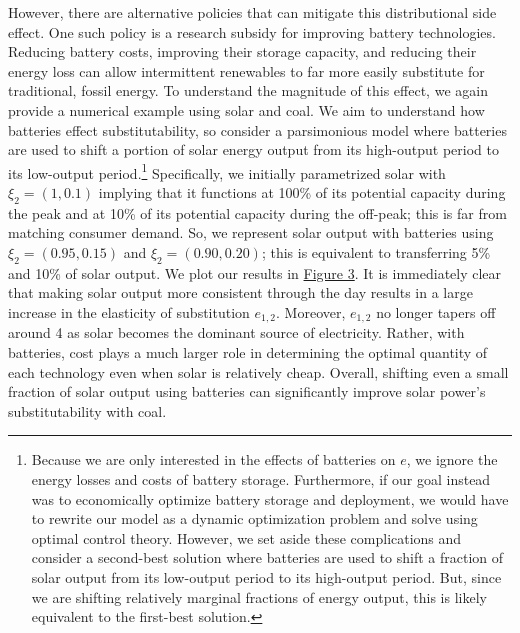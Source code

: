 \documentclass[11pt,a4paper]{extarticle}
\begin{document}
However, there are alternative policies that can mitigate this distributional side effect. One such policy is a research subsidy for improving battery technologies. Reducing battery costs, improving their storage capacity, and reducing their  energy loss can allow intermittent renewables to far more easily substitute for traditional, fossil energy. To understand the magnitude of this effect, we again provide a numerical example using solar and coal. We aim to understand how batteries effect substitutability, so consider a parsimonious model where batteries are used to shift a portion of solar energy output from its high-output period to its low-output period.\footnote{Because we are only interested in the effects of batteries on $e$, we ignore the energy losses and costs of battery storage. Furthermore, if our goal instead was to economically optimize battery storage and deployment, we would have to   rewrite our model as a dynamic optimization problem and solve using optimal control theory. However, we set aside these complications and consider a second-best solution where batteries are used to shift a fraction of solar output from its low-output period to its high-output period. But, since we are shifting relatively marginal fractions of energy output, this is likely equivalent to the first-best solution. } Specifically, we initially parametrized solar with $\xi_{2} = (1, 0.1)$ implying that it functions at 100\% of its potential capacity during the peak and at 10\% of its potential capacity during the off-peak; this is far from matching consumer demand. So, we represent solar output with batteries using $\xi_2 = (0.95, 0.15)$ and $\xi_2 = (0.90, 0.20)$; this is equivalent to transferring 5\% and 10\% of solar output.  We plot our results in \hyperref[fig:battery]{Figure 3}. It is immediately clear that making solar output more consistent through the day results in a large increase in the elasticity of substitution $e_{1,2}$. Moreover,  $e_{1,2}$ no longer tapers off around 4 as solar becomes the dominant source of electricity. Rather, with batteries, cost plays a much larger role in determining the optimal quantity of each technology even when solar is relatively cheap. Overall, shifting even a small fraction of solar output using batteries can significantly improve solar power's substitutability with coal. 
\end{document}
